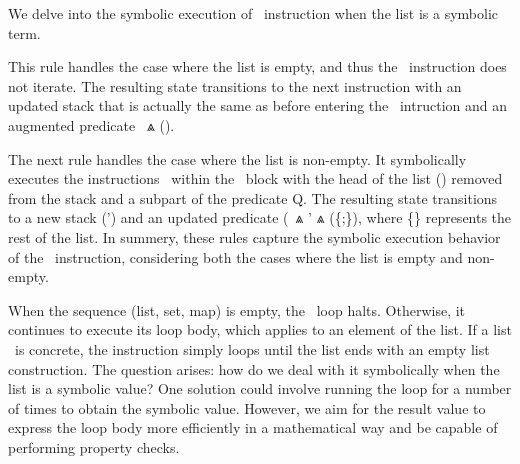 \documentclass[a4paper,USenglish,cleveref, autoref, thm-restate]{lipics-v2021}
\begin{document}
We delve into the symbolic execution of \ITER\ instruction when the list is a symbolic term.
\begin{mathpar}
\end{mathpar}
This rule handles the case where the list is empty, and thus the \ITER\ instruction does not iterate. The resulting state transitions to the next instruction with an updated stack that is actually the same as before entering the \ITER\ intruction and an augmented predicate \PREDICATE\ $\Wedge$ (\StackOne \EQ \EMPTYLIST).
\begin{mathpar}
\end{mathpar}
The next rule handles the case where the list is non-empty. It symbolically executes the instructions \INSTRUCTIONONE\ within the \ITER\ block with the head of the list (\HEAD) removed from the stack and a subpart of the predicate Q. The resulting state transitions to a new stack (\STACK') and an updated predicate (\PREDICATE\ $\Wedge$ \Q' $\Wedge$ (\StackOne \EQ \{\HEAD;\STAIL\}), where \{\STAIL\} represents the rest of the list.
In summery, these rules capture the symbolic execution behavior of the \ITER\ instruction, considering both the cases where the list is empty and non-empty.

When the sequence (list, set, map) is empty, the \ITER\ loop halts. Otherwise, it continues to execute its loop body, which applies to an element of the list. If a list \LIST\ is concrete, the instruction simply loops until the list ends with an empty list construction. The question arises: how do we deal with it symbolically when the list is a symbolic value? One solution could involve running the loop for a number of times to obtain the symbolic value. However, we aim for the result value to express the loop body more efficiently in a mathematical way and be capable of performing property checks.
\end{document}
